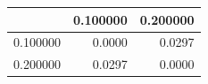 \begin{tabular}{lrr}
\toprule
 & 0.100000 & 0.200000 \\
\midrule
0.100000 & 0.0000 & 0.0297 \\
0.200000 & 0.0297 & 0.0000 \\
\bottomrule
\end{tabular}
